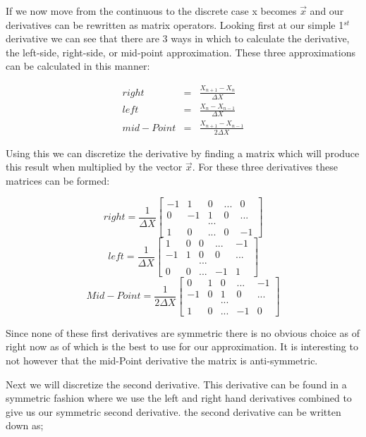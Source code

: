 \documentclass[12pt]{article}
\begin{document}
If we now move from the continuous to the discrete case x becomes $\vec{x}$ and our derivatives can be rewritten as matrix operators. Looking first at our simple 1$^{st}$ derivative we can see that there are 3 ways in which to calculate the derivative, the left-side, right-side, or mid-point approximation. These three approximations can be calculated in this manner:

\begin{eqnarray*}
right &=& \frac{X_{n+1} - X_{n}}{\Delta X}\\
left &=& \frac{X_{n} - X_{n-1}}{\Delta X}\\
mid-Point &=& \frac{X_{n+1} - X_{n-1}}{2 \Delta X}
\end{eqnarray*}

Using this we can discretize the derivative by finding a matrix which will produce this result when multiplied by the vector $\vec{x}$. For these three derivatives these matrices can be formed:

\[
right = \frac{1}{\Delta X}
\begin{bmatrix}
-1 & 1 & 0 &  ... & 0\\
0 & -1 & 1 & 0 &  ...\\
& & ... & & \\
1 & 0 & ... & 0 & -1
\end{bmatrix}
\]
\[
left = \frac{1}{\Delta X}
\begin{bmatrix}
1 & 0 & 0 &  ... & -1\\
-1 & 1 & 0 & 0 &  ...\\
& & ... & & \\
0 & 0 & ... & -1 & 1
\end{bmatrix}
\]
\[
Mid-Point = \frac{1}{2 \Delta X}
\begin{bmatrix}
0 & 1 & 0 &  ... & -1\\
-1 & 0 & 1 & 0 &  ...\\
& & ... & & \\
1 & 0 & ... & -1 & 0
\end{bmatrix}
\]

Since none of these first derivatives are symmetric there is no obvious choice as of right now as of which is the best to use for our approximation. It is interesting to not however that the mid-Point derivative the matrix is anti-symmetric.

Next we will discretize the second derivative. This derivative can be found in a symmetric fashion where we use the left and right hand derivatives combined to give us our symmetric second derivative. the second derivative can be written down as;
\end{document}
